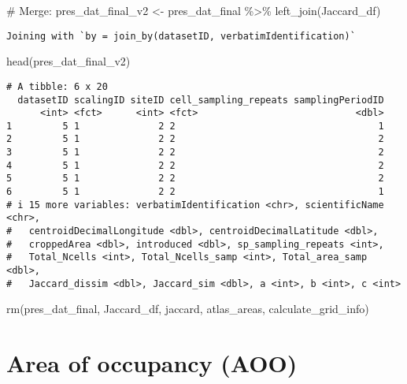\documentclass[
  letterpaper,
  DIV=11,
  numbers=noendperiod]{scrreprt}
\newenvironment{Shaded}{\begin{snugshade}}{\end{snugshade}}
\newcommand{\CommentTok}[1]{\textcolor[rgb]{0.37,0.37,0.37}{#1}}
\newcommand{\FunctionTok}[1]{\textcolor[rgb]{0.28,0.35,0.67}{#1}}
\newcommand{\NormalTok}[1]{\textcolor[rgb]{0.00,0.23,0.31}{#1}}
\newcommand{\OtherTok}[1]{\textcolor[rgb]{0.00,0.23,0.31}{#1}}
\newcommand{\SpecialCharTok}[1]{\textcolor[rgb]{0.37,0.37,0.37}{#1}}
\begin{document}
\begin{Shaded}
\begin{Highlighting}[]
\CommentTok{\# Merge:}
\NormalTok{pres\_dat\_final\_v2 }\OtherTok{\textless{}{-}}\NormalTok{ pres\_dat\_final }\SpecialCharTok{\%\textgreater{}\%}
  \FunctionTok{left\_join}\NormalTok{(Jaccard\_df)}
\end{Highlighting}
\end{Shaded}

\begin{verbatim}
Joining with `by = join_by(datasetID, verbatimIdentification)`
\end{verbatim}

\begin{Shaded}
\begin{Highlighting}[]
\FunctionTok{head}\NormalTok{(pres\_dat\_final\_v2)}
\end{Highlighting}
\end{Shaded}

\begin{verbatim}
# A tibble: 6 x 20
  datasetID scalingID siteID cell_sampling_repeats samplingPeriodID
      <int> <fct>      <int> <fct>                            <dbl>
1         5 1              2 2                                    1
2         5 1              2 2                                    2
3         5 1              2 2                                    2
4         5 1              2 2                                    2
5         5 1              2 2                                    2
6         5 1              2 2                                    1
# i 15 more variables: verbatimIdentification <chr>, scientificName <chr>,
#   centroidDecimalLongitude <dbl>, centroidDecimalLatitude <dbl>,
#   croppedArea <dbl>, introduced <dbl>, sp_sampling_repeats <int>,
#   Total_Ncells <int>, Total_Ncells_samp <int>, Total_area_samp <dbl>,
#   Jaccard_dissim <dbl>, Jaccard_sim <dbl>, a <int>, b <int>, c <int>
\end{verbatim}

\begin{Shaded}
\begin{Highlighting}[]
\FunctionTok{rm}\NormalTok{(pres\_dat\_final, Jaccard\_df, jaccard, atlas\_areas, calculate\_grid\_info)}
\end{Highlighting}
\end{Shaded}

\hypertarget{area-of-occupancy-aoo}{%
\section{Area of occupancy (AOO)}\label{area-of-occupancy-aoo}}
\end{document}
